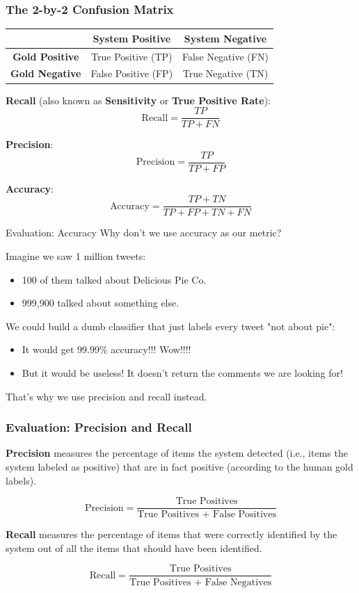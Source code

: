 \documentclass[handout]{beamer}
\begin{document}
\begin{frame}
\frametitle{The 2-by-2 Confusion Matrix}
\begin{table}[h]
\centering
\begin{tabular}{|c|c|c|}
\hline
\textbf{} & \textbf{System Positive} & \textbf{System Negative} \\
\hline
\textbf{Gold Positive} & True Positive (TP) & False Negative (FN) \\
\hline
\textbf{Gold Negative} & False Positive (FP) & True Negative (TN) \\
\hline
\end{tabular}
\end{table}

\textbf{Recall} (also known as \textbf{Sensitivity} or \textbf{True Positive Rate}):
\[ \text{Recall} = \frac{TP}{TP + FN} \]

\textbf{Precision}:
\[ \text{Precision} = \frac{TP}{TP + FP} \]

\textbf{Accuracy}:
\[ \text{Accuracy} = \frac{TP + TN}{TP + FP + TN + FN} \]

\end{frame}


\begin{frame}{Evaluation: Accuracy}
Why don't we use accuracy as our metric?

Imagine we saw 1 million tweets:
\begin{itemize}
\item 100 of them talked about Delicious Pie Co.
\item 999,900 talked about something else.
\end{itemize}

We could build a dumb classifier that just labels every tweet "not about pie":
\begin{itemize}
\item It would get 99.99\% accuracy!!! Wow!!!!
\item But it would be useless! It doesn't return the comments we are looking for!
\end{itemize}

That's why we use precision and recall instead.
\end{frame}


\begin{frame}
\frametitle{Evaluation: Precision and Recall}
\textbf{Precision} measures the percentage of items the system detected (i.e., items the system labeled as positive) that are in fact positive (according to the human gold labels).

\[
\text{Precision} = \frac{\text{True Positives}}{\text{True Positives + False Positives}}
\]


\textbf{Recall} measures the percentage of items that were correctly identified by the system out of all the items that should have been identified.

\[
\text{Recall} = \frac{\text{True Positives}}{\text{True Positives + False Negatives}}
\]

\end{frame}
\end{document}
